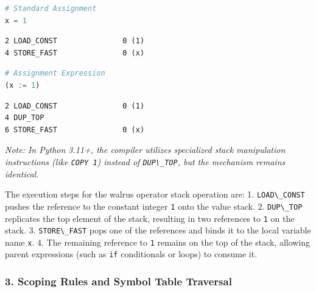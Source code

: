 \begin{lstlisting}[language=Python]
# Standard Assignment
x = 1
\end{lstlisting}

\begin{lstlisting}
2 LOAD_CONST               0 (1)
4 STORE_FAST               0 (x)
\end{lstlisting}

\begin{lstlisting}[language=Python]
# Assignment Expression
(x := 1)
\end{lstlisting}

\begin{lstlisting}
2 LOAD_CONST               0 (1)
4 DUP_TOP
6 STORE_FAST               0 (x)
\end{lstlisting}

\emph{Note: In Python 3.11+, the compiler utilizes specialized stack
manipulation instructions (like \passthrough{\lstinline!COPY 1!})
instead of \passthrough{\lstinline!DUP\_TOP!}, but the mechanism remains
identical.}

The execution steps for the walrus operator stack operation are: 1.
\passthrough{\lstinline!LOAD\_CONST!} pushes the reference to the
constant integer \passthrough{\lstinline!1!} onto the value stack. 2.
\passthrough{\lstinline!DUP\_TOP!} replicates the top element of the
stack, resulting in two references to \passthrough{\lstinline!1!} on the
stack. 3. \passthrough{\lstinline!STORE\_FAST!} pops one of the
references and binds it to the local variable name
\passthrough{\lstinline!x!}. 4. The remaining reference to
\passthrough{\lstinline!1!} remains on the top of the stack, allowing
parent expressions (such as \passthrough{\lstinline!if!} conditionals or
loops) to consume it.

\hypertarget{scoping-rules-and-symbol-table-traversal}{%
\subsubsection{3. Scoping Rules and Symbol Table
Traversal}\label{scoping-rules-and-symbol-table-traversal}}


